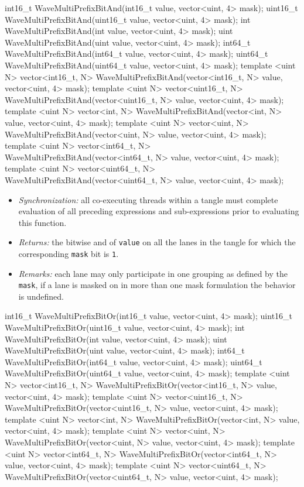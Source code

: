 \begin{HLSL}
int16_t WaveMultiPrefixBitAnd(int16_t value, vector<uint, 4> mask);
uint16_t WaveMultiPrefixBitAnd(uint16_t value, vector<uint, 4> mask);
int WaveMultiPrefixBitAnd(int value, vector<uint, 4> mask);
uint WaveMultiPrefixBitAnd(uint value, vector<uint, 4> mask);
int64_t WaveMultiPrefixBitAnd(int64_t value, vector<uint, 4> mask);
uint64_t WaveMultiPrefixBitAnd(uint64_t value, vector<uint, 4> mask);
template <uint N>
vector<int16_t, N> WaveMultiPrefixBitAnd(vector<int16_t, N> value, vector<uint, 4> mask);
template <uint N>
vector<uint16_t, N> WaveMultiPrefixBitAnd(vector<uint16_t, N> value, vector<uint, 4> mask);
template <uint N>
vector<int, N> WaveMultiPrefixBitAnd(vector<int, N> value, vector<uint, 4> mask);
template <uint N>
vector<uint, N> WaveMultiPrefixBitAnd(vector<uint, N> value, vector<uint, 4> mask);
template <uint N>
vector<int64_t, N> WaveMultiPrefixBitAnd(vector<int64_t, N> value, vector<uint, 4> mask);
template <uint N>
vector<uint64_t, N> WaveMultiPrefixBitAnd(vector<uint64_t, N> value, vector<uint, 4> mask);
\end{HLSL}

\begin{itemize}
  \item \textit{Synchronization:} all co-executing threads within a \gls{tangle}
  must complete evaluation of all preceding expressions and sub-expressions
  prior to evaluating this function.
  \item \textit{Returns:} the bitwise and of \texttt{value} on all the
  \gls{lane}s in the \gls{tangle} for which the corresponding \texttt{mask} bit
  is \texttt{1}.
  \item \textit{Remarks:} each \gls{lane} may only participate in one grouping
  as defined by the \texttt{mask}, if a \gls{lane} is masked on in more than one
  mask formulation the behavior is undefined.
\end{itemize}

\begin{HLSL}
int16_t WaveMultiPrefixBitOr(int16_t value, vector<uint, 4> mask);
uint16_t WaveMultiPrefixBitOr(uint16_t value, vector<uint, 4> mask);
int WaveMultiPrefixBitOr(int value, vector<uint, 4> mask);
uint WaveMultiPrefixBitOr(uint value, vector<uint, 4> mask);
int64_t WaveMultiPrefixBitOr(int64_t value, vector<uint, 4> mask);
uint64_t WaveMultiPrefixBitOr(uint64_t value, vector<uint, 4> mask);
template <uint N>
vector<int16_t, N> WaveMultiPrefixBitOr(vector<int16_t, N> value, vector<uint, 4> mask);
template <uint N>
vector<uint16_t, N> WaveMultiPrefixBitOr(vector<uint16_t, N> value, vector<uint, 4> mask);
template <uint N>
vector<int, N> WaveMultiPrefixBitOr(vector<int, N> value, vector<uint, 4> mask);
template <uint N>
vector<uint, N> WaveMultiPrefixBitOr(vector<uint, N> value, vector<uint, 4> mask);
template <uint N>
vector<int64_t, N> WaveMultiPrefixBitOr(vector<int64_t, N> value, vector<uint, 4> mask);
template <uint N>
vector<uint64_t, N> WaveMultiPrefixBitOr(vector<uint64_t, N> value, vector<uint, 4> mask);
\end{HLSL}

